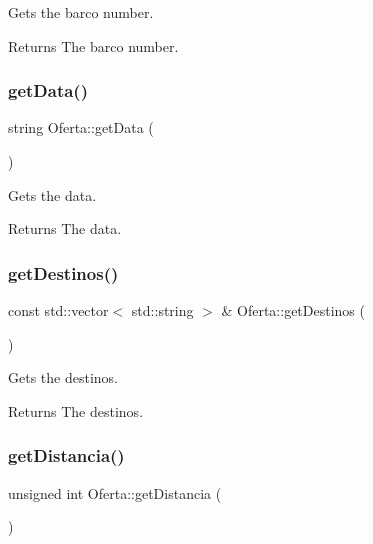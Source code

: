 Gets the barco number. 

\begin{DoxyReturn}{Returns}
The barco number. 
\end{DoxyReturn}
\mbox{\label{classOferta_a2b156b75371ad59af54ad96ad79c9d1e}} 
\subsubsection{\texorpdfstring{get\+Data()}{getData()}}
{\footnotesize\ttfamily string Oferta\+::get\+Data (\begin{DoxyParamCaption}{ }\end{DoxyParamCaption})}



Gets the data. 

\begin{DoxyReturn}{Returns}
The data. 
\end{DoxyReturn}
\mbox{\label{classOferta_a746c91e5db19098d211a3f6bde2ec8ec}} 
\subsubsection{\texorpdfstring{get\+Destinos()}{getDestinos()}}
{\footnotesize\ttfamily const std\+::vector$<$ std\+::string $>$ \& Oferta\+::get\+Destinos (\begin{DoxyParamCaption}{ }\end{DoxyParamCaption})}



Gets the destinos. 

\begin{DoxyReturn}{Returns}
The destinos. 
\end{DoxyReturn}
\mbox{\label{classOferta_a0d07f80f25f4fb21c0819c3e25d67fb9}} 
\subsubsection{\texorpdfstring{get\+Distancia()}{getDistancia()}}
{\footnotesize\ttfamily unsigned int Oferta\+::get\+Distancia (\begin{DoxyParamCaption}{ }\end{DoxyParamCaption})\hspace{0.3cm}{\ttfamily [inline]}}



